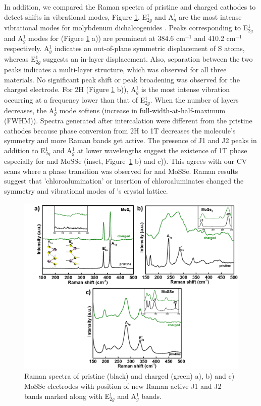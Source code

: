 In addition, we compared the Raman spectra of pristine and charged cathodes to detect shifts in vibrational modes, Figure \ref{Figures/chap4fig:fig5}. E$^1_{2g}$ and A$^1_g$ are the most intense vibrational modes for molybdenum dichalcogenides \cite{yang_pressure-induced_2019, r_2d_2017,sharma_stable_2018}. Peaks corresponding to E$^1_{2g}$ and A$^1_g$ modes for  (Figure \ref{Figures/chap4fig:fig5} a)) are prominent at 384.6 cm$^{-1}$ and 410.2 cm$^{-1}$ respectively. A$^1_g$ indicates an out-of-plane symmetric displacement of S atoms, whereas E$^1_{2g}$ suggests an in-layer displacement. Also, separation between the two peaks indicates a multi-layer structure, which was observed for all three materials. No significant peak shift or peak broadening was observed for the charged  electrode. For 2H  (Figure \ref{Figures/chap4fig:fig5} b)), A$^1_g$ is the most intense vibration occurring at a frequency lower than that of E$^1_{2g}$. When the number of layers decreases, the A$^1_g$ mode softens (increase in full-width-at-half-maximum (FWHM)). Spectra generated after intercalation were different from the pristine cathodes because phase conversion from 2H to 1T decreases the molecule's symmetry and more Raman bands get active. The presence of J1 and J2 peaks in addition to E$^1_{2g}$ and A$^1_g$ at lower wavelengths suggest the existence of 1T phase especially for  and MoSSe (inset, Figure\ \ref{Figures/chap4fig:fig5} b) and c)). This agrees with our CV scans where a phase transition was observed for  and MoSSe. Raman results suggest that 'chloroalumination' or insertion of chloroaluminates changed the symmetry and vibrational modes of 's crystal lattice. 

\begin{figure}
  \centering
  \includegraphics[width=\textwidth]{Figures/chap4fig/fig5}
  \caption{Raman spectra of pristine (black) and charged (green) a), b)  and c) MoSSe electrodes with position of new Raman active J1 and J2 bands marked along with E$^1_{2g}$ and A$^1_g$ bands.}
  \label{Figures/chap4fig:fig5}
\end{figure}

